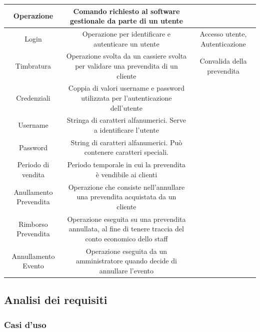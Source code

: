 \documentclass[a4paper]{article}
\begin{document}
\begin{table}[ht!]
\begin{center}
\begin{tabulary}{1\textwidth}{|c|C|C|}
		\hline
		Operazione & Comando richiesto al software gestionale da parte di un utente & \\
		\hline
		Login & Operazione per identificare e autenticare un utente & Accesso utente, Autenticazione \\
		\hline
		Timbratura & Operazione svolta da un cassiere svolta per validare una prevendita di un cliente & Convalida della prevendita \\
		\hline
		Credenziali & Coppia di valori username e password utilizzata per l'autenticazione dell'utente & \\
		\hline
		Username & Stringa di caratteri alfanumerici. Serve a identificare l'utente & \\
		\hline
		Password & String di caratteri alfanumerici. Può contenere caratteri speciali. & \\
		\hline
		Periodo di vendita & Periodo temporale in cui la prevendita è vendibile ai clienti & \\
		\hline
		Anullamento Prevendita & Operazione che consiste nell'annullare una prevendita acquistata da un cliente & \\
		\hline
		Rimborso Prevendita & Operazione eseguita su una prevendita annullata, al fine di tenere traccia del conto economico dello staff & \\
		\hline
		Annullamento Evento & Operazione eseguita da un amministratore quando decide di annullare l'evento & \\
		\hline
    \end{tabulary}
  \end{center}
\end{table}

\newpage

\subsection{Analisi dei requisiti}
\subsubsection{Casi d'uso}

\end{document}
